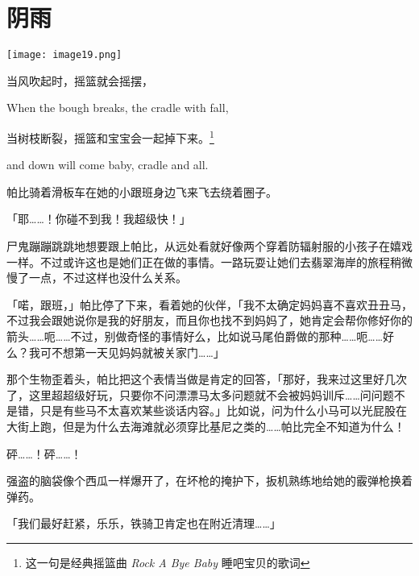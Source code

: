 \chapter{阴雨}

\texttt{[image: image19.png]}

\begin{intro}
    当风吹起时，摇篮就会摇摆，
    
\begin{englishlyric}
    When the bough breaks, the cradle with fall,
\end{englishlyric}

    \medskip

    当树枝断裂，摇篮和宝宝会一起掉下来。\footnote{这一句是经典摇篮曲 \emph{Rock A Bye Baby} 睡吧宝贝的歌词}

\begin{englishlyric}
    and down will come baby, cradle and all.
\end{englishlyric}
\end{intro}


帕比骑着滑板车在她的小跟班身边飞来飞去绕着圈子。

「耶……！你碰不到我！我超级快！」

尸鬼蹦蹦跳跳地想要跟上帕比，从远处看就好像两个穿着防辐射服的小孩子在嬉戏一样。不过或许这也是她们正在做的事情。一路玩耍让她们去翡翠海岸的旅程稍微慢了一点，不过这样也没什么关系。

「喏，跟班，」帕比停了下来，看着她的伙伴，「我不太确定妈妈喜不喜欢丑丑马，不过我会跟她说你是我的好朋友，而且你也找不到妈妈了，她肯定会帮你修好你的箭头……呃……不过，别做奇怪的事情好么，比如说马尾伯爵做的那种……呃……好么？我可不想第一天见妈妈就被关家门……」

那个生物歪着头，帕比把这个表情当做是肯定的回答，「那好，我来过这里好几次了，这里超超级好玩，只要你不问漂漂马太多问题就不会被妈妈训斥……问问题不是错，只是有些马不太喜欢某些谈话内容。」比如说，问为什么小马可以光屁股在大街上跑，但是为什么去海滩就必须穿比基尼之类的……帕比完全不知道为什么！

\horizonline


砰……！砰……！

强盗的脑袋像个西瓜一样爆开了，在坏枪的掩护下，扳机熟练地给她的霰弹枪换着弹药。

「我们最好赶紧，乐乐，铁骑卫肯定也在附近清理……」

